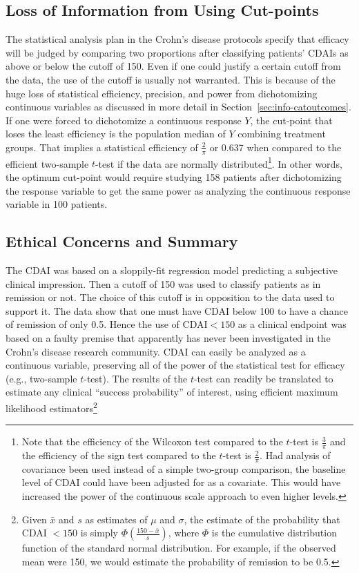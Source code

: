 \subsection{Loss of Information from Using Cut-points}
The statistical analysis plan in the Crohn's disease protocols specify
that efficacy will be judged by comparing two proportions after
classifying patients' CDAIs as above or below the cutoff of 150.
Even if one could justify a certain cutoff from the data, the use of the
cutoff is usually not warranted.  This is because of the huge loss of
statistical efficiency, precision, and power from dichotomizing
continuous variables as discussed in more detail in
Section~\ref{sec:info-catoutcomes}.
If one were forced to dichotomize a continuous
response $Y$, the cut-point that loses the least efficiency is the
population median of $Y$ combining treatment groups.  That implies a
statistical efficiency of $\frac{2}{\pi}$ or 0.637 when compared to
the efficient two-sample $t$-test if the data are normally
distributed\footnote{Note that the efficiency of the Wilcoxon test
  compared to the $t$-test is $\frac{3}{\pi}$ and the efficiency of
  the sign test compared to the $t$-test is $\frac{2}{\pi}$.  Had
  analysis of covariance been used instead of a simple two-group
  comparison, the baseline level of CDAI could have been adjusted for
  as a covariate.  This would have increased the power of the
  continuous scale approach to even higher levels.}.  In other words,
the optimum cut-point would require
studying 158 patients after dichotomizing the response variable to get
the same power as analyzing the continuous response variable in 100
patients.

\subsection{Ethical Concerns and Summary}
The CDAI was based on a sloppily-fit regression model predicting a
subjective clinical impression.  Then a cutoff of 150 was used to
classify patients as in remission or not.  The choice of this cutoff
is in opposition to the data used to support it.  The data show that
one must have CDAI below 100 to have a chance of remission of only
0.5.  Hence the use of CDAI$<150$ as a clinical endpoint was
based on a faulty premise that apparently has never been investigated
in the Crohn's disease research community.   CDAI can
easily be analyzed as a continuous variable, preserving all of
the power of the statistical test for efficacy (e.g., two-sample
$t$-test).  The results of the $t$-test can readily be translated to
estimate any clinical ``success probability'' of interest, using
efficient maximum likelihood estimators\footnote{Given $\bar{x}$ and
  $s$ as estimates of $\mu$ and $\sigma$, the estimate of the
  probability that CDAI $< 150$ is simply $\Phi(\frac{150-\bar{x}}{s})$, where
  $\Phi$ is the cumulative distribution function of the standard
  normal distribution.  For example, if the observed mean were 150, we
would estimate the probability of remission to be 0.5.}

